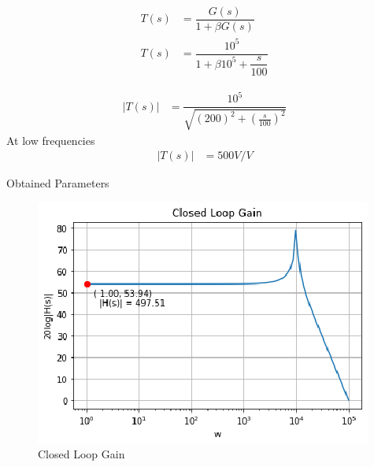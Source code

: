 \begin{enumerate}[label=\thesection.\arabic*.,ref=\thesection.\theenumi]
\begin{align}
T(s) &= \dfrac{G(s)}{1+\beta G(s)}
\\
T(s) &= \dfrac{10^{5}}{1+\beta 10^{5}+ \dfrac{s}{100}}
\end{align}

\begin{align}
|T(s)| &= \dfrac{10^{5}}{\sqrt{(200)^{2} + (\frac{s}{100})^{2}}}
\end{align}
At low frequencies
\begin{align}
|T(s)| &= 500 V/V
\end{align}

\begin{table}[!ht]
\centering

\caption{Obtained Parameters}
\label{table:ee18btech11001_params}
\end{table}


\begin{figure}[!ht]
\centering
    \includegraphics[width=\columnwidth]{./figs/ee18btech11001/Figure_2.eps}
  \caption{Closed Loop Gain}
  \label{fig:ee18btech11001_fig2}
\end{figure}


\end{enumerate}
